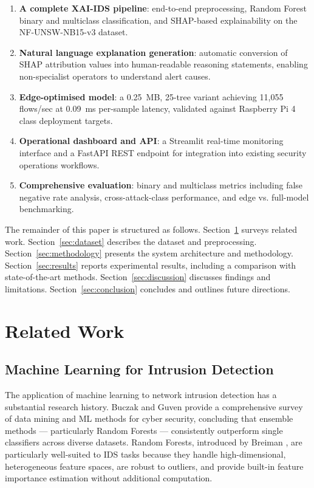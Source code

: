 \documentclass[12pt,a4paper]{article}
\begin{document}
\begin{enumerate}
  \item \textbf{A complete XAI-IDS pipeline}: end-to-end preprocessing, Random
        Forest binary and multiclass classification, and SHAP-based explainability
        on the NF-UNSW-NB15-v3 dataset.
  \item \textbf{Natural language explanation generation}: automatic conversion of
        SHAP attribution values into human-readable reasoning statements, enabling
        non-specialist operators to understand alert causes.
  \item \textbf{Edge-optimised model}: a 0.25~MB, 25-tree variant achieving
        11,055 flows/sec at 0.09~ms per-sample latency, validated against
        Raspberry Pi 4 class deployment targets.
  \item \textbf{Operational dashboard and API}: a Streamlit real-time monitoring
        interface and a FastAPI REST endpoint for integration into existing
        security operations workflows.
  \item \textbf{Comprehensive evaluation}: binary and multiclass metrics including
        false negative rate analysis, cross-attack-class performance, and
        edge vs. full-model benchmarking.
\end{enumerate}

The remainder of this paper is structured as follows.
Section~\ref{sec:related} surveys related work.
Section~\ref{sec:dataset} describes the dataset and preprocessing.
Section~\ref{sec:methodology} presents the system architecture and methodology.
Section~\ref{sec:results} reports experimental results, including a
comparison with state-of-the-art methods.
Section~\ref{sec:discussion} discusses findings and limitations.
Section~\ref{sec:conclusion} concludes and outlines future directions.

\section{Related Work}
\label{sec:related}

\subsection{Machine Learning for Intrusion Detection}

The application of machine learning to network intrusion detection has a substantial
research history. Buczak and Guven \cite{buczak2016survey} provide a comprehensive
survey of data mining and ML methods for cyber security, concluding that ensemble
methods — particularly Random Forests — consistently outperform single classifiers
across diverse datasets. Random Forests, introduced by Breiman \cite{breiman2001random},
are particularly well-suited to IDS tasks because they handle high-dimensional,
heterogeneous feature spaces, are robust to outliers, and provide built-in feature
importance estimation without additional computation.
\end{document}
